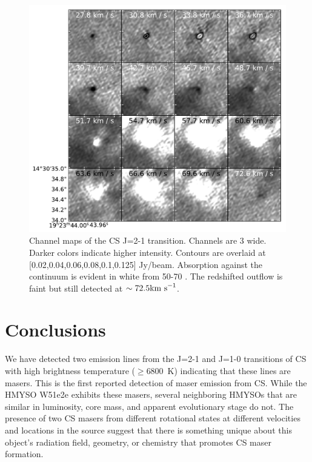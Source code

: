 \documentclass[twocolumn]{aastex62}
\begin{document}

\begin{figure}
    \includegraphics[]{figures/CS_maser_channel_maps.pdf}
    \caption{Channel maps of the CS J=2-1 transition.  Channels are 3 \kms
    wide.  Darker colors indicate higher intensity.  Contours are overlaid at
    [0.02,0.04,0.06,0.08,0.1,0.125] Jy/beam.  Absorption against the continuum
    is evident in white from 50-70 \kms.  The redshifted outflow is faint but still
    detected at
    $\sim72.5\textrm{km~s}^{-1}$.
    }
    \label{fig:channelmaps}
\end{figure}

\section{Conclusions}
We have detected two emission lines from the J=2-1 and J=1-0 transitions of CS
with high brightness temperature ($\geq$6800~K) indicating that these lines are masers.
This is the first reported detection of maser emission from CS.
While the HMYSO W51e2e exhibits these masers, several neighboring HMYSOs that
are similar in luminosity, core mass, and apparent evolutionary stage
do not.  The presence of two CS masers from different rotational states
at different velocities and locations in the source suggest that there is something
unique about this object's radiation field, geometry, or chemistry that
promotes CS maser formation.
\end{document}
